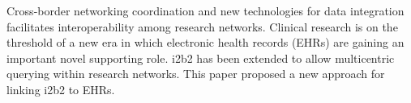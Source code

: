 \documentclass{amia}
\begin{document}
Cross-border networking coordination and new technologies for data integration facilitates interoperability among research networks. Clinical research is on the threshold of a new era in which electronic health records (EHRs) are gaining an important novel supporting role. i2b2 has been extended to allow multicentric querying within research networks.  This paper proposed a new approach for linking i2b2 to EHRs.
%
%
%
%
\end{document}
